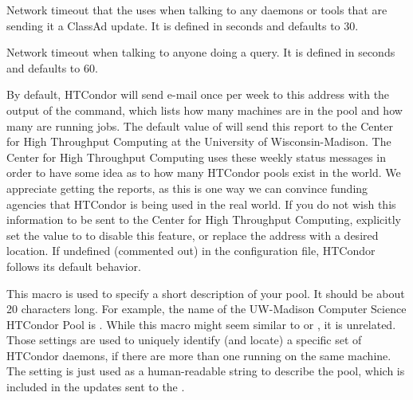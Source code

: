 \begin{description}
\label{param:ClientTimeout}
\item[\Macro{CLIENT\_TIMEOUT}]
  Network timeout that the  uses when talking to any daemons
  or tools that are sending it a ClassAd update.
  It is defined in seconds and defaults to 30.
  
\label{param:QueryTimeout}
\item[\Macro{QUERY\_TIMEOUT}]
  Network timeout when talking to anyone doing a query.
  It is defined in seconds and defaults to 60.
  
\label{param:CondorDevelopers}
\item[\Macro{CONDOR\_DEVELOPERS}]
  By default,
  HTCondor will send e-mail once per week to this address with the output
  of the  command, which lists how many machines
  are in the pool and how many are running jobs.  The default
  value of  will send this report to
  the Center for High Throughput Computing at 
  the University of Wisconsin-Madison.
  The Center for High Throughput Computing uses
  these weekly status messages in order to have some idea as to how
  many HTCondor pools exist in the world.  We appreciate
  getting the reports, as this is one way we can convince funding
  agencies that HTCondor is being used in the real world.  
  If you do not wish this information to be sent to 
  the Center for High Throughput Computing,
  explicitly set the value to  to disable this feature,
  or replace the
  address with a desired location.  
  If undefined (commented out) in the configuration file, HTCondor follows
  its default behavior.

\label{param:CollectorName}
\item[\Macro{COLLECTOR\_NAME}]
  This macro is used to specify a short description of your pool.
  It should be about 20 characters long.  For example, the name of the
  UW-Madison Computer Science HTCondor Pool is .  
  While this macro might seem similar to  or
  , it is unrelated.
  Those settings are used to uniquely identify (and locate) a specific
  set of HTCondor daemons, if there are more than one running on the same
  machine.
  The  setting is just used as a
  human-readable string to describe the pool, which is included in the
  updates sent to the .


\end{description}
